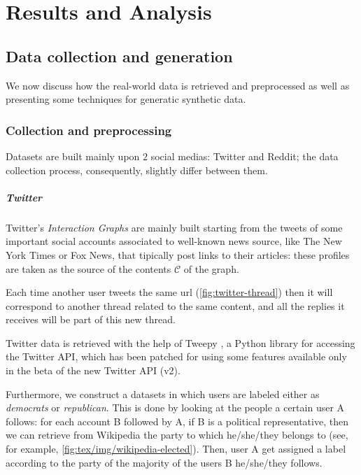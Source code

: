 \chapter{Results and Analysis}
\label{ch:resultsAndAnalysis}

\section{Data collection and generation}%
\label{sec:data_collection_and_generation}

We now discuss how the real-world data is retrieved and preprocessed as well as
presenting some techniques for generatic synthetic data.

\subsection{Collection and preprocessing}%
\label{sub:collection_and_preprocessing}

Datasets are built mainly upon $2$ social medias: Twitter and Reddit; the data
collection process, consequently, slightly differ between them.

\paragraph{Twitter}%
\label{par:twitter-data}

Twitter's \emph{Interaction Graphs} are mainly built starting from the tweets
of some important social accounts associated to well-known news source, like The
New York Times or Fox News, that tipically post links to their articles:
these profiles are taken as the source of the contents $\mathcal{C} $ of the graph.

Each time another user tweets the same url (\autoref{fig:twitter-thread}) then
it will correspond to another thread related to the same content, and all the
replies it receives will be part of this new thread.

Twitter data is retrieved with the help of Tweepy \cite{tweepy}, a Python
library for accessing the Twitter API, which has been patched for using some
features available only in the beta of the new Twitter API (v2).

Furthermore, we construct a datasets in which users are labeled either as
\emph{democrats} or \emph{republican}. This is done by looking at the people a
certain user A follows: for each account B followed by A, if B is a political representative, then we can
retrieve from Wikipedia the party to which he/she/they belongs to (see, for
example, \autoref{fig:tex/img/wikipedia-elected}). Then, user A get assigned a
label according to the party of the majority of the users B he/she/they
follows.

